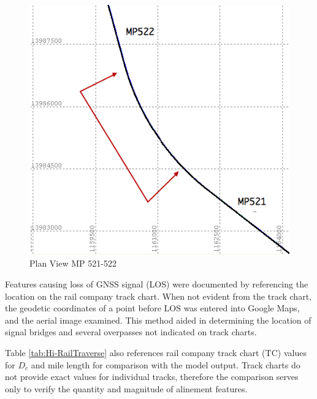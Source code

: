\begin{itemize}
\begin{figure}[!ht]
	\begin{center}
	\vspace{0pt}
	\includegraphics[scale=0.30]{graphics/521-522curve}
	\caption{Plan View MP 521-522}
	\label{crv521}
	\end{center}
	\vspace{-10pt}
\end{figure}

\end{itemize}

Features causing loss of GNSS signal (LOS) were documented by referencing the location on the rail company track chart. When not evident from the track chart, the geodetic coordinates of a point before LOS was entered into Google Maps, and the aerial image examined. This method aided in determining the location of signal bridges and several overpasses not indicated on track charts.

Table \ref{tab:Hi-RailTraverse} also references rail company track chart (TC) values for ${D_c}$ and mile length for comparison with the model output. Track charts do not provide exact values for individual tracks, therefore the comparison serves only to verify the quantity and magnitude of alinement features.

